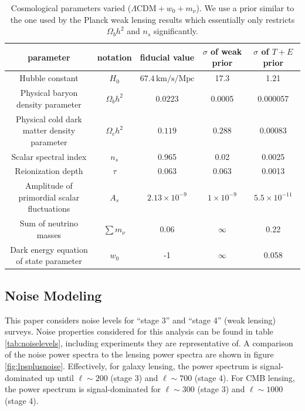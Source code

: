 \documentclass[11pt]{article} %
\begin{document}
\begin{table}[h!]
    \centering
    \scriptsize
    \begin{tabular}{|c|c|c|c|c|}
        \hline
        \textbf{parameter} & \textbf{notation} & \textbf{fiducial value} & \textbf{$\sigma$ of weak prior} & \textbf{$\sigma$ of $T + E$ prior}\\
        \hline
        Hubble constant & $H_0$ & $67.4 \, \text{km/s/Mpc}$ & 17.3 & 1.21\\
        \hline
        Physical baryon density parameter & $\Omega_b h^2$ & $0.0223$ & 0.0005 & 0.000057\\
        \hline
        Physical cold dark matter density parameter & $\Omega_c h^2$ & $0.119$ & $0.288$ & 0.00083\\
        \hline
        Scalar spectral index & $n_s$ & 0.965 & 0.02 & 0.0025 \\
        \hline
        Reionization depth & $\tau$ & 0.063 & 0.063 & 0.0013 \\
        \hline
        Amplitude of primordial scalar fluctuations & $A_s$ & $2.13 \times 10^{-9}$ & $1\times 10^{-9}$ & $5.5\times 10^{-11}$\\
        \hline
        Sum of neutrino masses & $\sum m_\nu$ & $0.06$ & $\infty$ & 0.22\\
        \hline
        Dark energy equation of state parameter & $w_0$ & -1 & $\infty$ & 0.058 \\ 
        \hline
    \end{tabular}
    \caption{Cosmological parameters varied ($\Lambda \text{CDM} + w_0 + m_\nu$). We use a prior similar to the one used by the Planck weak lensing results \cite{Planck2018Lensing} which essentially only restricts $\Omega_bh^2$ and $n_s$ significantly.}
    \label{tab:fiducialpars}
\end{table}

\subsection{Noise Modeling}
This paper considers noise levels for ``stage 3'' and ``stage 4'' (weak lensing) surveys. Noise properties considered for this analysis can be found in table \ref{tab:noiselevels}, including experiments they are representative of. A comparison of the noise power spectra to the lensing power spectra are shown     in figure \ref{fig:lpsplusnoise}. Effectively, for galaxy lensing, the power spectrum is signal-dominated up until $\ell \sim 200$ (stage 3) and $\ell \sim 700$ (stage 4). For CMB lensing, the power spectrum is signal-dominated for $\ell \sim 300$ (stage 3) and $\ell \sim 1000$ (stage 4). 
\end{document}
